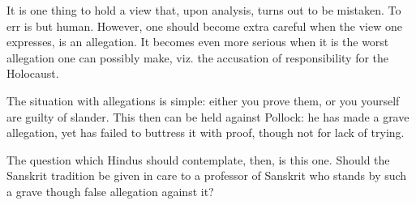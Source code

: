 It is one thing to hold a view that, upon analysis, turns out to be mistaken. To err is but human. However, one should become extra careful when the view one expresses, is an allegation. It becomes even more serious when it is the worst allegation one can possibly make, viz. the accusation of responsibility for the Holocaust.

The situation with allegations is simple: either you prove them, or you yourself are guilty of slander. This then can be held against Pollock: he has made a grave allegation, yet has failed to buttress it with proof, though not for lack of trying.

The question which Hindus should contemplate, then, is this one. Should the Sanskrit tradition be given in care to a professor of Sanskrit who stands by such a grave though false allegation against it?

\newpage

